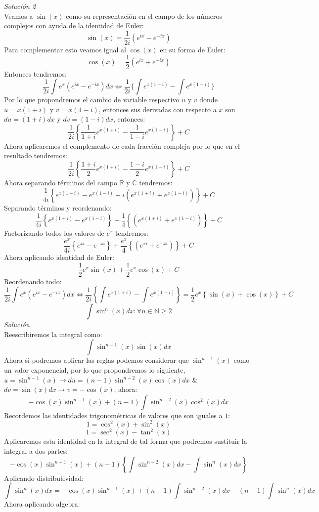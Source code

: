 \documentclass[10pt]{article}
\begin{document}
\textit{Solución 2}\\
Veamos a $\sin(x)$ como su representación en el campo de los números complejos con ayuda de la identidad de Euler:
\[\sin(x)= \frac{1}{2i}(e^{ix}-e^{-ix})\]
Para complementar esto veamos igual al $\cos(x)$ en su forma de Euler:
\[\cos(x)= \frac{1}{2}(e^{ix}+e^{-ix})\]
Entonces tendremos:
\[\frac{1}{2i}\int e^{x}(e^{ix}-e^{-ix})dx \Leftrightarrow \frac{1}{2i}\{\int e^{x(1+i)} - \int e^{x(1-i)}\}\]
Por lo que propondremos el cambio de variable respectivo $u$ y $v$ donde $u=x(1+i)$ y $v=x(1-i)$, entonces sus derivadas con respecto a $x$ son $du=(1+i)dx$ y $dv=(1-i)dx$, entonces:
\[\frac{1}{2i}\left\{\frac{1}{1+i}e^{x(1+i)}-\frac{1}{1-i}e^{x(1-i)}\right\}+C\]
Ahora aplicaremos el complemento de cada fracción compleja por lo que en el resultado tendremos:
\[\frac{1}{2i}\left\{\frac{1+i}{2}e^{x(1+i)}-\frac{1-i}{2}e^{x(1-i)}\right\}+C\]
Ahora separando términos del campo $\mathbb{R}$ y $\mathbb{C}$ tendremos:
\[\frac{1}{4i}\left\{e^{x(1+i)}-e^{x(1-i)} + i(e^{x(1+i)}+e^{x(1-i)})\right\}+C\]
Separando términos y reordenando:
\[\frac{1}{4i}\left\{e^{x(1+i)}-e^{x(1-i)}\right\} + \frac{1}{4}\left\{(e^{x(1+i)}+e^{x(1-i)})\right\}+C\]
Factorizando todos los valores de $e^{x}$ tendremos:
\[\frac{e^{x}}{4i}\left\{e^{xi}-e^{-xi}\right\} + \frac{e^{x}}{4}\left\{(e^{xi}+e^{-xi})\right\}+C\]
Ahora aplicando identidad de Euler:
\[\frac{1}{2}e^{x}\sin(x) + \frac{1}{2}e^{x}\cos(x)+C\]
Reordenando todo:
\[\frac{1}{2i}\int e^{x}(e^{ix}-e^{-ix})dx \Leftrightarrow \frac{1}{2i}\left\{\int e^{x(1+i)} - \int e^{x(1-i)}\right\} = \frac{1}{2}e^x\left\{\sin(x)+\cos(x)\right\}+C\]
\clearpage
\[\int \sin^{n}(x)dx \colon \forall n\in\mathbb{N}\geq 2\]
\textit{Solución}\\
Reescribiremos la integral como:
\[\int \sin^{n-1}(x)\sin(x)dx\]
Ahora si podremos aplicar las reglas podemos considerar que $\sin^{n-1}(x)$ como un valor exponencial, por lo que propondremos lo siguiente, $u=\sin^{n-1}(x) \rightarrow du=(n-1)\sin^{n-2}(x)\cos(x)dx$ \& $dv = \sin(x)dx \rightarrow v=-\cos(x)$, ahora:
\[-\cos(x)\sin^{n-1}(x) + (n-1)\int \sin^{n-2}(x)\cos^{2}(x)dx\]
Recordemos las identidades trigonométricas de valores que son iguales a $1$:
\[1=\cos^2(x)+\sin^{2}(x)\]
\[1=\sec^{2}(x)-\tan^{2}(x)\]
Aplicaremos esta identidad en la integral de tal forma que podremos sustituir la integral a dos partes:
\[-\cos(x)\sin^{n-1}(x) + (n-1)\left\{\int \sin^{n-2}(x)dx -\int\sin^{n}(x)dx\right\}\]
Aplicando distributividad:
\[\int\sin^{n}(x)dx=-\cos(x)\sin^{n-1}(x) + (n-1)\int \sin^{n-2}(x)dx -(n-1)\int\sin^{n}(x)dx\]
Ahora aplicando algebra:
\end{document}
